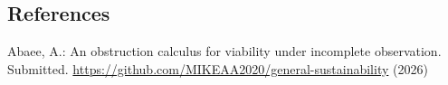 \documentclass[10pt,twocolumn]{article}
\theoremstyle{definition}
\begin{document}
\subsection{References}\label{references}
{\footnotesize

Abaee, A.: An obstruction calculus for viability under incomplete
observation. Submitted.
\url{https://github.com/MIKEAA2020/general-sustainability} (2026)

}
\end{document}
